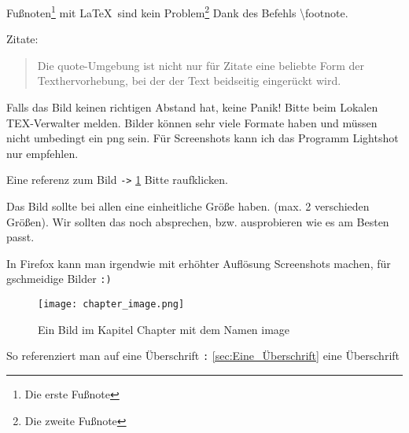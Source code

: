 Fußnoten\footnote{Die erste Fußnote} mit \LaTeX\ sind kein Problem\footnote{Die zweite Fußnote} Dank des Befehls \textbackslash footnote.

Zitate:

\begin{quote}
    Die quote-Umgebung ist nicht nur für Zitate eine beliebte Form
    der Texthervorhebung, bei der der Text beidseitig eingerückt wird.
\end{quote}


Falls das Bild keinen richtigen Abstand hat, keine Panik! Bitte beim Lokalen TEX-Verwalter melden.
Bilder können sehr viele Formate haben und müssen nicht umbedingt ein png sein.
Für Screenshots kann ich das Programm Lightshot nur empfehlen.

Eine referenz zum Bild \verb+->+ \ref{chapter:image} Bitte raufklicken.

Das Bild sollte bei allen eine einheitliche Größe haben. (max. 2 verschieden Größen). Wir sollten das noch absprechen,
bzw. ausprobieren wie es am Besten passt.

In Firefox kann man irgendwie mit erhöhter Auflösung Screenshots machen, für gschmeidige Bilder \verb-:)-

\begin{figure}[h]
    \centering
    \texttt{[image: chapter\_image.png]}
    \caption{Ein Bild im Kapitel Chapter mit dem Namen image}
    \label{chapter:image}
\end{figure}

So referenziert man auf eine Überschrift \verb-:- \autoref{sec:Eine_Überschrift} eine Überschrift